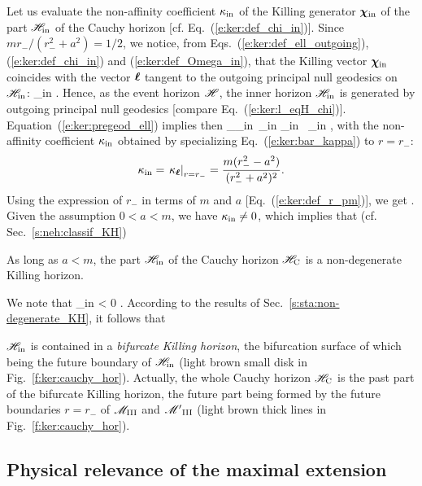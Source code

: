 Let us evaluate the non-affinity coefficient $\kappa_{\rm in}$ of the Killing
generator $\bm{\chi}_{\rm in}$ of the part $\mathscr{H}_{\rm in}$ of the
Cauchy horizon [cf. Eq.~(\ref{e:ker:def_chi_in})].
Since $m r_- /(r_-^2+a^2) = 1/2$,
we notice, from Eqs.~(\ref{e:ker:def_ell_outgoing}), (\ref{e:ker:def_chi_in}) and (\ref{e:ker:def_Omega_in}), that the Killing vector $\bm{\chi}_{\rm in}$ coincides with
the vector $\bm{\ell}$ tangent to the outgoing principal
null geodesics on $\mathscr{H}_{\rm in}$:
\be
    \w{\chi}_{\rm in}  \wl .
\ee
Hence, as the event horizon $\mathscr{H}$, the inner horizon $\mathscr{H}_{\rm in}$
is generated by outgoing principal null geodesics [compare Eq.~(\ref{e:ker:l_eqH_chi})].
Equation~(\ref{e:ker:pregeod_ell}) implies then
\be
     \wnab_{\w{\chi}_{\rm in}}\, \w{\chi}_{\rm in}  \kappa_{\rm in} \, \w{\chi}_{\rm in} ,
\ee
with the non-affinity coefficient $\kappa_{\rm in}$ obtained by specializing
Eq.~(\ref{e:ker:bar_kappa}) to $r=r_-$:
\[
    \kappa_{\rm in} = \left. \kappa_{\bm{\ell}} \right| _{r=r_-} =
    \frac{m(r_-^2-a^2)}{(r_-^2+a^2)^2} .
\]
Using the expression of $r_-$ in terms of $m$ and $a$ [Eq.~(\ref{e:ker:def_r_pm})], we get
\be
     .
\ee
Given the assumption $0<a<m$, we have $\kappa_{\rm in} \not=0$, which implies that
(cf. Sec.~\ref{s:neh:classif_KH})
\begin{greybox}
As long as $a<m$, the part $\mathscr{H}_{\rm in}$ of the Cauchy horizon $\mathscr{H}_{\rm C}$ is a non-degenerate Killing horizon.
\end{greybox}
We note that
\be
    \kappa_{\rm in} < 0 .
\ee
According to the results of Sec.~\ref{s:sta:non-degenerate_KH}, it follows
that
\begin{greybox}
$\mathscr{H}_{\rm in}$ is contained in a \emph{bifurcate Killing horizon}, the
bifurcation surface of which being the future boundary of $\mathscr{H}_{\rm in}$
(light brown small disk in Fig.~\ref{f:ker:cauchy_hor}).
Actually, the whole Cauchy horizon $\mathscr{H}_{\rm C}$ is the past part of the bifurcate Killing horizon,
the future part being formed by the future
boundaries $r=r_-$ of $\mathscr{M}_{\rm III}$ and ${\mathscr{M}'}_{\rm III}$ (light brown thick lines in Fig.~\ref{f:ker:cauchy_hor}).
\end{greybox}

\subsection{Physical relevance of the maximal extension}

